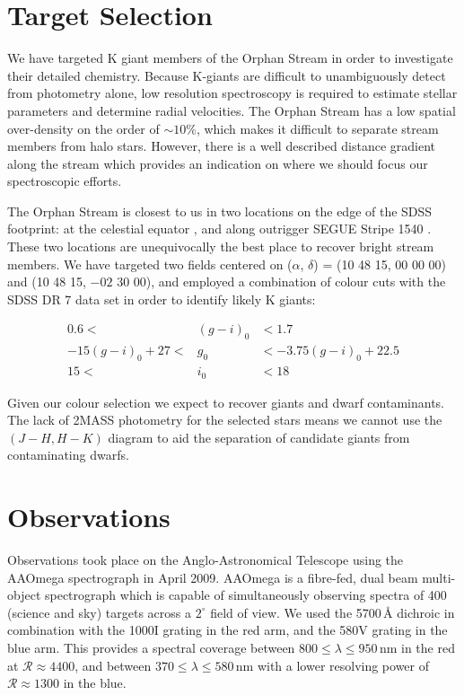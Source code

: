 \documentclass{emulateapj}
\begin{document}
\section{Target Selection}
\label{sec:target-selection}

We have targeted K giant members of the Orphan Stream in order to investigate their detailed chemistry. Because K-giants are difficult to unambiguously detect from photometry alone, low resolution spectroscopy is required to estimate stellar parameters and determine radial velocities. The Orphan Stream has a low spatial over-density on the order of $\sim10\%$, which makes it difficult to separate stream members from halo stars. However, there is a well described distance gradient along the stream \citep{Belokurov;et-al_2007, Newberg;et-al_2010} which provides an indication on where we should focus our spectroscopic efforts.

The Orphan Stream is closest to us in two locations on the edge of the SDSS footprint: at the celestial equator \citep{Belokurov;et-al_2007}, and along outrigger SEGUE Stripe 1540 \citep{Newberg;et-al_2010}. These two locations are unequivocally the best place to recover bright stream members. We have targeted two fields centered on ($\alpha$, $\delta$) = (10 48 15, 00 00 00) and (10 48 15, $-02$ 30 00), and employed a combination of colour cuts with the SDSS DR 7 \citep{Abazajian;et-al_2009} data set in order to identify likely K giants:

\begin{eqnarray}
0.6 <& (g-i)_0 &< 1.7 \\
-15(g-i)_0 + 27 <& g_0 &< -3.75(g-i)_0 + 22.5 \\
15  <& i_0  &< 18 
\end{eqnarray}

Given our colour selection we expect to recover giants and dwarf contaminants. The lack of 2MASS photometry for the selected stars means we cannot use the $(J-H, H-K)$ diagram to aid the separation of candidate giants from contaminating dwarfs.

\section{Observations}
\label{sec:observations}

Observations took place on the Anglo-Astronomical Telescope using the AAOmega spectrograph in April 2009. AAOmega is a fibre-fed, dual beam multi-object spectrograph which is capable of simultaneously observing spectra of 400 (science and sky) targets across a $2^\circ$ field of view. We used the 5700\,{\AA} dichroic in combination with the 1000I grating in the red arm, and the 580V grating in the blue arm. This provides a spectral coverage between $800 \leq \lambda \leq 950$\,nm in the red at $\mathcal{R} \approx 4400$, and between $370 \leq \lambda \leq 580$\,nm with a lower resolving power of $\mathcal{R} \approx 1300$ in the blue.
\end{document}
